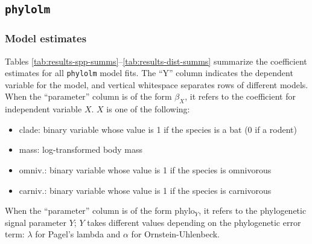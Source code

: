 \documentclass[12pt,]{article}
\providecommand{\tightlist}{%
  \setlength{\itemsep}{0pt}\setlength{\parskip}{0pt}}
\begin{document}
\hypertarget{phylolm}{%
\subsection{\texorpdfstring{\texttt{phylolm}}{phylolm}}\label{phylolm}}

\hypertarget{model-estimates}{%
\subsubsection{Model estimates}\label{model-estimates}}

Tables \ref{tab:results-spp-summs}--\ref{tab:results-dist-summs} summarize the
coefficient estimates for all \texttt{phylolm} model fits.
The ``Y'' column indicates the dependent variable for the model, and
vertical whitespace separates rows of different models.
When the ``parameter'' column is of the form \(\beta_X\), it refers to the coefficient
for independent variable \(X\). \(X\) is one of the following:

\begin{itemize}
\tightlist
\item
  clade: binary variable whose value is 1 if the species is a bat (0 if a rodent)
\item
  mass: log-transformed body mass
\item
  omniv.: binary variable whose value is 1 if the species is omnivorous
\item
  carniv.: binary variable whose value is 1 if the species is carnivorous
\end{itemize}

When the ``parameter'' column is of the form phylo\(_Y\), it refers to the
phylogenetic signal parameter \(Y\);
\(Y\) takes different values depending on the phylogenetic error term:
\(\lambda\) for Pagel's lambda and \(\alpha\) for Ornstein-Uhlenbeck.
\end{document}
